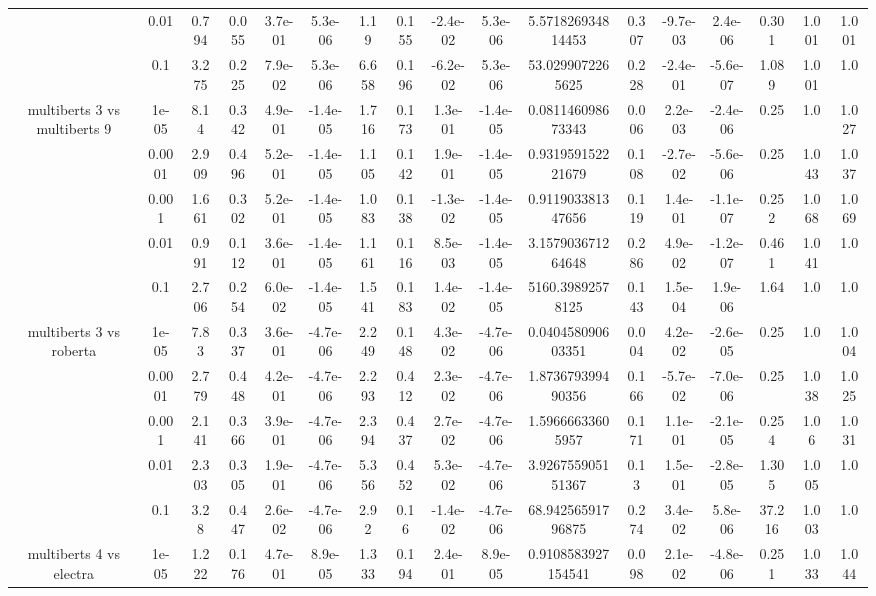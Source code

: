 \begin{tabular}{|c|c|c|c|c|c|c|c|c|c|c|c|c|c|c|c|c|}
 & 0.01 & 0.794 & 0.055 & 3.7e-01 & 5.3e-06 & 1.19 & 0.155 & -2.4e-02 & 5.3e-06 & 5.571826934814453 & 0.307 & -9.7e-03 & 2.4e-06 & 0.301 & 1.001 & 1.001 \\
 & 0.1 & 3.275 & 0.225 & 7.9e-02 & 5.3e-06 & 6.658 & 0.196 & -6.2e-02 & 5.3e-06 & 53.0299072265625 & 0.228 & -2.4e-01 & -5.6e-07 & 1.089 & 1.001 & 1.0 \\
\hline
\multirow{5}{*}{multiberts 3 vs multiberts 9} & 1e-05 & 8.14 & 0.342 & 4.9e-01 & -1.4e-05 & 1.716 & 0.173 & 1.3e-01 & -1.4e-05 & 0.081146098673343 & 0.006 & 2.2e-03 & -2.4e-06 & 0.25 & 1.0 & 1.027 \\
 & 0.0001 & 2.909 & 0.496 & 5.2e-01 & -1.4e-05 & 1.105 & 0.142 & 1.9e-01 & -1.4e-05 & 0.931959152221679 & 0.108 & -2.7e-02 & -5.6e-06 & 0.25 & 1.043 & 1.037 \\
 & 0.001 & 1.661 & 0.302 & 5.2e-01 & -1.4e-05 & 1.083 & 0.138 & -1.3e-02 & -1.4e-05 & 0.911903381347656 & 0.119 & 1.4e-01 & -1.1e-07 & 0.252 & 1.068 & 1.069 \\
 & 0.01 & 0.991 & 0.112 & 3.6e-01 & -1.4e-05 & 1.161 & 0.116 & 8.5e-03 & -1.4e-05 & 3.157903671264648 & 0.286 & 4.9e-02 & -1.2e-07 & 0.461 & 1.041 & 1.0 \\
 & 0.1 & 2.706 & 0.254 & 6.0e-02 & -1.4e-05 & 1.541 & 0.183 & 1.4e-02 & -1.4e-05 & 5160.39892578125 & 0.143 & 1.5e-04 & 1.9e-06 & 1.64 & 1.0 & 1.0 \\
\hline
\multirow{5}{*}{multiberts 3 vs roberta } & 1e-05 & 7.83 & 0.337 & 3.6e-01 & -4.7e-06 & 2.249 & 0.148 & 4.3e-02 & -4.7e-06 & 0.040458090603351 & 0.004 & 4.2e-02 & -2.6e-05 & 0.25 & 1.0 & 1.004 \\
 & 0.0001 & 2.779 & 0.448 & 4.2e-01 & -4.7e-06 & 2.293 & 0.412 & 2.3e-02 & -4.7e-06 & 1.873679399490356 & 0.166 & -5.7e-02 & -7.0e-06 & 0.25 & 1.038 & 1.025 \\
 & 0.001 & 2.141 & 0.366 & 3.9e-01 & -4.7e-06 & 2.394 & 0.437 & 2.7e-02 & -4.7e-06 & 1.59666633605957 & 0.171 & 1.1e-01 & -2.1e-05 & 0.254 & 1.06 & 1.031 \\
 & 0.01 & 2.303 & 0.305 & 1.9e-01 & -4.7e-06 & 5.356 & 0.452 & 5.3e-02 & -4.7e-06 & 3.926755905151367 & 0.13 & 1.5e-01 & -2.8e-05 & 1.305 & 1.005 & 1.0 \\
 & 0.1 & 3.28 & 0.447 & 2.6e-02 & -4.7e-06 & 2.92 & 0.16 & -1.4e-02 & -4.7e-06 & 68.94256591796875 & 0.274 & 3.4e-02 & 5.8e-06 & 37.216 & 1.003 & 1.0 \\
\hline
\multirow{5}{*}{multiberts 4 vs electra } & 1e-05 & 1.222 & 0.176 & 4.7e-01 & 8.9e-05 & 1.333 & 0.194 & 2.4e-01 & 8.9e-05 & 0.9108583927154541 & 0.098 & 2.1e-02 & -4.8e-06 & 0.251 & 1.033 & 1.044 \\

\end{tabular}
